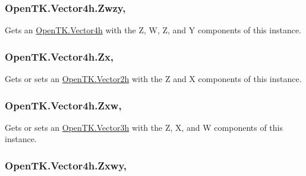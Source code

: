 \hypertarget{struct_open_t_k_1_1_vector4h_af4d5e52d5c3c7b437c6cab6162feded1}{
\subsubsection[{Zwzy}]{ Open\-T\-K.\-Vector4h.\-Zwzy\hspace{0.3cm}{\ttfamily [get]}, {\ttfamily [set]}}}\label{struct_open_t_k_1_1_vector4h_af4d5e52d5c3c7b437c6cab6162feded1}


Gets an \hyperlink{struct_open_t_k_1_1_vector4h}{Open\-T\-K.\-Vector4h} with the Z, W, Z, and Y components of this instance. 

\hypertarget{struct_open_t_k_1_1_vector4h_ac928e48f712449f994d57f6e6f1886ab}{
\subsubsection[{Zx}]{ Open\-T\-K.\-Vector4h.\-Zx\hspace{0.3cm}{\ttfamily [get]}, {\ttfamily [set]}}}\label{struct_open_t_k_1_1_vector4h_ac928e48f712449f994d57f6e6f1886ab}


Gets or sets an \hyperlink{struct_open_t_k_1_1_vector2h}{Open\-T\-K.\-Vector2h} with the Z and X components of this instance. 

\hypertarget{struct_open_t_k_1_1_vector4h_a6b295839c01dd1dbecc7bc966bc91a21}{
\subsubsection[{Zxw}]{ Open\-T\-K.\-Vector4h.\-Zxw\hspace{0.3cm}{\ttfamily [get]}, {\ttfamily [set]}}}\label{struct_open_t_k_1_1_vector4h_a6b295839c01dd1dbecc7bc966bc91a21}


Gets or sets an \hyperlink{struct_open_t_k_1_1_vector3h}{Open\-T\-K.\-Vector3h} with the Z, X, and W components of this instance. 

\hypertarget{struct_open_t_k_1_1_vector4h_a6d6b767b7c187e6668d1f9b1892e38d8}{
\subsubsection[{Zxwy}]{ Open\-T\-K.\-Vector4h.\-Zxwy\hspace{0.3cm}{\ttfamily [get]}, {\ttfamily [set]}}}\label{struct_open_t_k_1_1_vector4h_a6d6b767b7c187e6668d1f9b1892e38d8}


